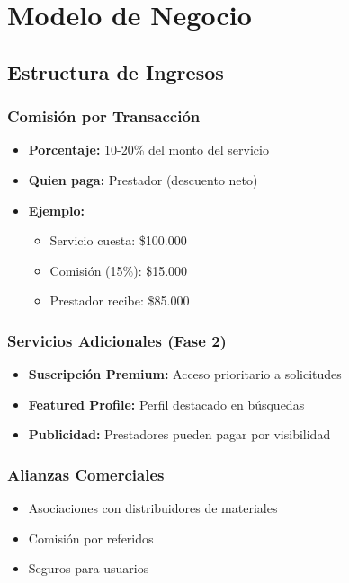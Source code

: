 \documentclass[12pt,a4paper,spanish]{article}
\begin{document}
\newpage

\section{Modelo de Negocio}

\subsection{Estructura de Ingresos}

\subsubsection{Comisión por Transacción}

\begin{itemize}
    \item \textbf{Porcentaje:} 10-20\% del monto del servicio
    \item \textbf{Quien paga:} Prestador (descuento neto)
    \item \textbf{Ejemplo:}
    \begin{itemize}
        \item Servicio cuesta: \$100.000
        \item Comisión (15\%): \$15.000
        \item Prestador recibe: \$85.000
    \end{itemize}
\end{itemize}

\subsubsection{Servicios Adicionales (Fase 2)}

\begin{itemize}
    \item \textbf{Suscripción Premium:} Acceso prioritario a solicitudes
    \item \textbf{Featured Profile:} Perfil destacado en búsquedas
    \item \textbf{Publicidad:} Prestadores pueden pagar por visibilidad
\end{itemize}

\subsubsection{Alianzas Comerciales}

\begin{itemize}
    \item Asociaciones con distribuidores de materiales
    \item Comisión por referidos
    \item Seguros para usuarios
\end{itemize}
\end{document}
